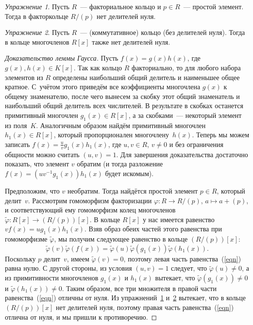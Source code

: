 \documentclass[a4paper,10pt]{amsart}
\theoremstyle{definition}
\theoremstyle{remark}
\newtheorem{exercise}{Упражнение}
\begin{document}
\begin{exercise} \label{ex_1}
Пусть $R$~--- факториальное кольцо и $p \in R$~--- простой элемент.
Тогда в факторкольце $R/(p)$ нет делителей нуля.
\end{exercise}

\begin{exercise} \label{ex_2}
Пусть $R$~--- (коммутативное) кольцо (без делителей нуля). Тогда в
кольце многочленов $R[x]$ также нет делителей нуля.
\end{exercise}

\begin{proof}[Доказательство леммы Гаусса]
Пусть $f(x) = g(x)h(x)$, где $g(x), h(x)\in K[x]$. Так как кольцо
$R$ факториально, то для любого набора элементов из $R$ определены
наибольший общий делитель и наименьшее общее кратное. С~учётом этого
приведём все коэффициенты многочлена $g(x)$ к общему знаменателю,
после чего вынесем за скобку этот общий знаменатель и наибольший
общий делитель всех числителей. В результате в скобках останется
примитивный многочлен $g_1(x) \in R[x]$, а за скобками~--- некоторый
элемент из поля~$K$. Аналогичным образом найдём примитивный
многочлен $h_1(x) \in R[x]$, который пропорционален
многочлену~$h(x)$. Теперь мы можем записать $f(x)=\frac{u}{v}g_1(x)
h_1(x)$, где $u,v \in R$, $v \ne 0$ и без ограничения общности можно
считать $(u,v)=1$. Для завершения доказательства достаточно
показать, что элемент $v$ обратим (и тогда разложение $f(x) =
(uv^{-1}g_1(x))h_1(x)$ будет искомым).

Предположим, что $v$ необратим. Тогда найдётся простой элемент $p
\in R$, который делит~$v$. Рассмотрим гомоморфизм факторизации
$\varphi \colon R \to R/(p)$, $a \mapsto a + (p)$, и соответствующий
ему гомоморфизм колец многочленов $\widetilde \varphi \colon R[x]
\to (R/(p))[x]$. В кольце $R[x]$ у нас имеется равенство $vf(x) =
ug_1(x)h_1(x)$. Взяв образ обеих частей этого равенства при
гомоморфизме $\widetilde \varphi$, мы получим следующее равенство в
кольце $(R / (p))[x]$:
\begin{equation} \label{eqn}
\widetilde \varphi(v) \widetilde \varphi(f(x)) = \widetilde
\varphi(u) \widetilde \varphi(g_1(x)) \widetilde \varphi(h_1(x)).
\end{equation}
Поскольку $p$ делит~$v$, имеем $\widetilde \varphi(v) = 0$, поэтому
левая часть равенства~(\ref{eqn}) равна нулю. С другой стороны, из
условия $(u,v) = 1$ следует, что $\widetilde \varphi(u) \ne 0$, а из
примитивности многочленов $g_1(x)$ и $h_1(x)$ вытекает, что
$\widetilde \varphi(g_1(x)) \ne 0$ и $\widetilde \varphi(h_1(x)) \ne
0$. Таким образом, все три множителя в правой части
равенства~(\ref{eqn}) отличны от нуля. Из упражнений~\ref{ex_1}
и~\ref{ex_2} вытекает, что в кольце $(R / (p))[x]$ нет делителей
нуля, поэтому правая часть равенства~(\ref{eqn}) отлична от нуля, и
мы пришли к противоречию.
\end{proof}
\end{document}
